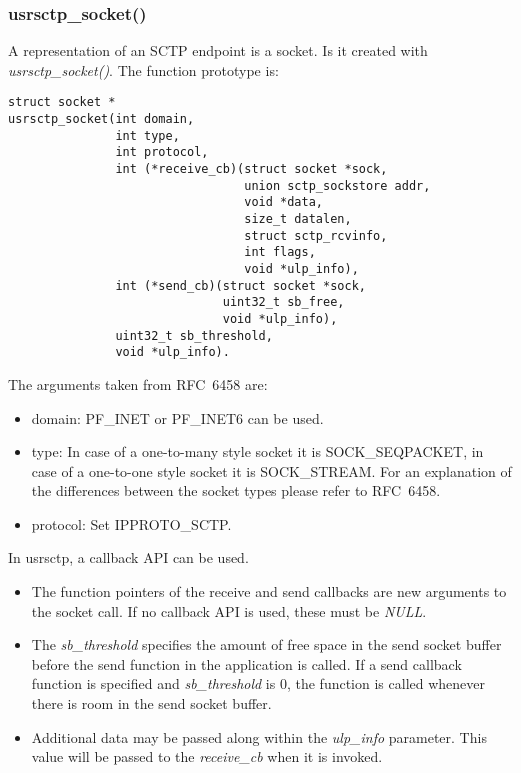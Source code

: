 \documentclass[a4paper]{article}
\begin{document}
\subsubsection{usrsctp\_socket()}
A representation of an SCTP endpoint is a socket. Is it created with \textit{usrsctp\_socket()}.
The function prototype is:
\begin{verbatim}
struct socket *
usrsctp_socket(int domain, 
               int type, 
               int protocol,
               int (*receive_cb)(struct socket *sock, 
                                 union sctp_sockstore addr, 
                                 void *data,
                                 size_t datalen, 
                                 struct sctp_rcvinfo, 
                                 int flags,
                                 void *ulp_info),
               int (*send_cb)(struct socket *sock, 
                              uint32_t sb_free, 
                              void *ulp_info), 
               uint32_t sb_threshold,
               void *ulp_info).
\end{verbatim}
The arguments taken from RFC~6458 are:
\begin{itemize}
\item domain: PF\_INET or PF\_INET6 can be used.
\item type: In case of a one-to-many style socket it is SOCK\_SEQPACKET, in case of a one-to-one style 
socket it is SOCK\_STREAM. For an explanation of the differences between the socket types please
refer to RFC~6458.
\item protocol: Set IPPROTO\_SCTP.
\end{itemize}

In usrsctp, a callback API can be used.
\begin{itemize}
\item The function pointers of the receive and send callbacks are new arguments to the socket call. If no callback API is used, these must be \textit{NULL}.
\item The \textit{sb\_threshold} specifies the amount of free space in the send socket buffer before the send function in the application is called. If a send callback function is specified and \textit{sb\_threshold} is 0, the function is called whenever there is room in the send socket buffer.
\item Additional data may be passed along within the \textit{ulp\_info} parameter. This value will be passed to the \textit{receive\_cb} when it is invoked.
\end{itemize}
\end{document}
